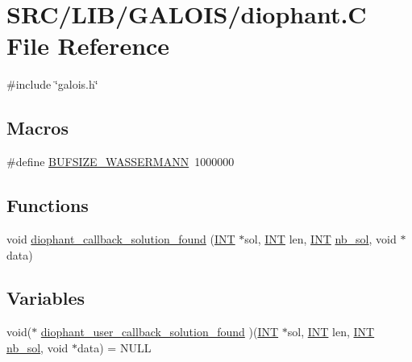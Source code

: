 \hypertarget{diophant_8_c}{}\section{S\+R\+C/\+L\+I\+B/\+G\+A\+L\+O\+I\+S/diophant.C File Reference}
\label{diophant_8_c}
{\ttfamily \#include \char`\"{}galois.\+h\char`\"{}}\newline
\subsection*{Macros}
\begin{DoxyCompactItemize}
\item 
\#define \mbox{\hyperlink{diophant_8_c_aa9cfffe01718f8328a3b5d39db098a80}{B\+U\+F\+S\+I\+Z\+E\+\_\+\+W\+A\+S\+S\+E\+R\+M\+A\+NN}}~1000000
\end{DoxyCompactItemize}
\subsection*{Functions}
\begin{DoxyCompactItemize}
\item 
void \mbox{\hyperlink{diophant_8_c_a9868811a3121c55ac9dc2a116aa15d0c}{diophant\+\_\+callback\+\_\+solution\+\_\+found}} (\mbox{\hyperlink{galois_8h_a09fddde158a3a20bd2dcadb609de11dc}{I\+NT}} $\ast$sol, \mbox{\hyperlink{galois_8h_a09fddde158a3a20bd2dcadb609de11dc}{I\+NT}} len, \mbox{\hyperlink{galois_8h_a09fddde158a3a20bd2dcadb609de11dc}{I\+NT}} \mbox{\hyperlink{plane__search_8_c_a0029b734487624c93c3a72d74a8f2bf9}{nb\+\_\+sol}}, void $\ast$data)
\end{DoxyCompactItemize}
\subsection*{Variables}
\begin{DoxyCompactItemize}
\item 
void($\ast$ \mbox{\hyperlink{diophant_8_c_a24aee7f8771e22c0abcbd30c80ffa6df}{diophant\+\_\+user\+\_\+callback\+\_\+solution\+\_\+found}} )(\mbox{\hyperlink{galois_8h_a09fddde158a3a20bd2dcadb609de11dc}{I\+NT}} $\ast$sol, \mbox{\hyperlink{galois_8h_a09fddde158a3a20bd2dcadb609de11dc}{I\+NT}} len, \mbox{\hyperlink{galois_8h_a09fddde158a3a20bd2dcadb609de11dc}{I\+NT}} \mbox{\hyperlink{plane__search_8_c_a0029b734487624c93c3a72d74a8f2bf9}{nb\+\_\+sol}}, void $\ast$data) = N\+U\+LL
\end{DoxyCompactItemize}


